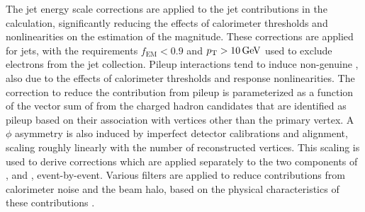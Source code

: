 The jet energy scale corrections are applied to the jet contributions in the \met calculation, significantly reducing the effects of calorimeter thresholds and nonlinearities on the estimation of the \met magnitude. These corrections are applied for jets, with the requirements $f_{\text{EM}}<0.9$ and $p_{\mathrm{T}}>10\,\text{Ge\hspace{-.08em}V}$ used to exclude electrons from the jet collection. Pileup interactions tend to induce non-genuine \met, also due to the effects of calorimeter thresholds and response nonlinearities. The correction to reduce the contribution from pileup is parameterized as a function of the vector sum of \vecpt from the charged hadron candidates that are identified as pileup based on their association with vertices other than the primary vertex. A $\phi$ asymmetry is also induced by imperfect detector calibrations and alignment, scaling roughly linearly with the number of reconstructed vertices. This scaling is used to derive corrections which are applied separately to the two components of \met, \mex and \mey, event-by-event. Various filters are applied to reduce contributions from calorimeter noise and the beam halo, based on the physical characteristics of these contributions \cite{METperf2011}.